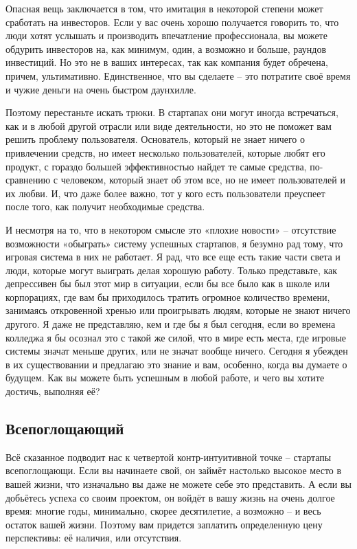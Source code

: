 \documentclass[ebook,12pt,oneside,openany]{memoir}
\begin{document}
Опасная вещь заключается в том, что имитация в некоторой степени может
сработать на инвесторов. Если у вас очень хорошо получается говорить
то, что люди хотят услышать и производить впечатление профессионала,
вы можете обдурить инвесторов на, как минимум, один, а возможно и
больше, раундов инвестиций. Но это не в ваших интересах, так как
компания будет обречена, причем, ультимативно. Единственное, что вы
сделаете – это потратите своё время и чужие деньги на очень быстром
даунхилле. \newline

Поэтому перестаньте искать трюки. В стартапах они могут иногда
встречаться, как и в любой другой отрасли или виде деятельности, но
это не поможет вам решить проблему пользователя. Основатель, который
не знает ничего о привлечении средств, но имеет несколько
пользователей, которые любят его продукт, с гораздо большей
эффективностью найдет те самые средства, по-сравнению с человеком,
который знает об этом все, но не имеет пользователей и их любви. И,
что даже более важно, тот у кого есть пользователи преуспеет после
того, как получит необходимые средства. \newline

И несмотря на то, что в некотором смысле это «плохие новости» –
отсутствие возможности «обыграть» систему успешных стартапов, я
безумно рад тому, что игровая система в них не работает. Я рад, что
все еще есть такие части света и люди, которые могут выиграть делая
хорошую работу. Только представьте, как депрессивен бы был этот мир в
ситуации, если бы все было как в школе или корпорациях, где вам бы
приходилось тратить огромное количество времени, занимаясь откровенной
хренью или проигрывать людям, которые не знают ничего другого. Я даже
не представляю, кем и где бы я был сегодня, если во времена колледжа я
бы осознал это с такой же силой, что в мире есть места, где игровые
системы значат меньше других, или не значат вообще ничего. Сегодня я
убежден в их существовании и предлагаю это знание и вам, особенно,
когда вы думаете о будущем. Как вы можете быть успешным в любой
работе, и чего вы хотите достичь, выполняя её? \newline

\subsection{Всепоглощающий}

Всё сказанное подводит нас к четвертой контр-интуитивной точке –
стартапы всепоглощающи. Если вы начинаете свой, он займёт настолько
высокое место в вашей жизни, что изначально вы даже не можете себе это
представить. А если вы добьётесь успеха со своим проектом, он войдёт в
вашу жизнь на очень долгое время: многие годы, минимально, скорее
десятилетие, а возможно – и весь остаток вашей жизни. Поэтому вам
придется заплатить определенную цену перспективы: её наличия, или
отсутствия. \newline
\end{document}
